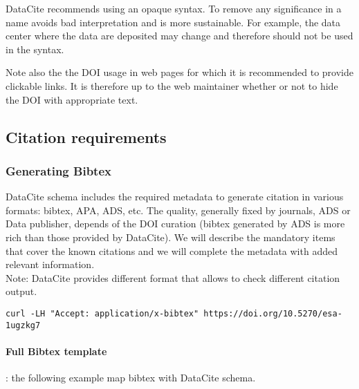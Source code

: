 \documentclass[11pt,a4paper]{ivoa}
\begin{document}
DataCite recommends using an opaque syntax. To remove any significance
in a name avoids bad interpretation and is more sustainable. For example,
the data center where the data are deposited may change and therefore
should not be used in the syntax.

Note also the the DOI usage in web pages for which it is recommended to provide clickable links. It is therefore up to the web maintainer whether or not to hide the DOI with appropriate text.

\subsection{Citation requirements}
\label{sec:citation}

\subsubsection{Generating Bibtex}
DataCite schema includes the required metadata to generate citation in various formats: bibtex, APA, ADS, etc. The quality, generally fixed by journals, ADS or Data publisher, depends of the DOI curation (bibtex generated by ADS is more rich than those provided by DataCite). 
We will describe the mandatory items that cover the known citations and we will complete the metadata with added relevant information.\\


Note: DataCite provides different format that allows to check different citation output.

\begin{verbatim}
curl -LH "Accept: application/x-bibtex" https://doi.org/10.5270/esa-1ugzkg7
\end{verbatim}


\paragraph{Full Bibtex template} : the following example map bibtex with DataCite schema.
\end{document}
